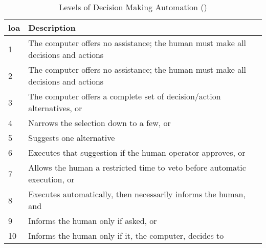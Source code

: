 \begin{table}\centering
  \caption[Levels of Decision Making Automation]{Levels of Decision Making Automation (\citet{Sheridan1978})}
  \label{tab:autonomy_levels_sheridan}
  \begin{tabularx}{\textwidth}{p{1cm} X}\toprule
    \gls{loa} & Description \\ \midrule
    1&    The computer offers no assistance; the human must make all decisions and actions\\
    2&    The computer offers no assistance; the human must make all decisions and actions\\
    3&    The computer offers a complete set of decision/action alternatives, or\\
    4&    Narrows the selection down to a few, or\\
    5&    Suggests one alternative\\
    6&    Executes that suggestion if the human operator approves, or\\
    7&    Allows the human a restricted time to veto before automatic execution, or\\
    8&    Executes automatically, then necessarily informs the human, and\\
    9&    Informs the human only if asked, or\\
    10&    Informs the human only if it, the computer, decides to\\\bottomrule
  \end{tabularx}
\end{table}

